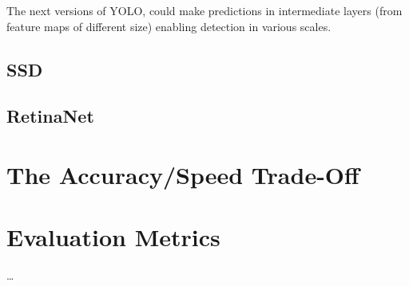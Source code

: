 The next versions of YOLO, could make predictions in intermediate layers (from feature maps of different size) enabling detection in various scales. 
 
\subsection{SSD}

\subsection{RetinaNet}

\section{The Accuracy/Speed Trade-Off}

\section{Evaluation Metrics}

\dots